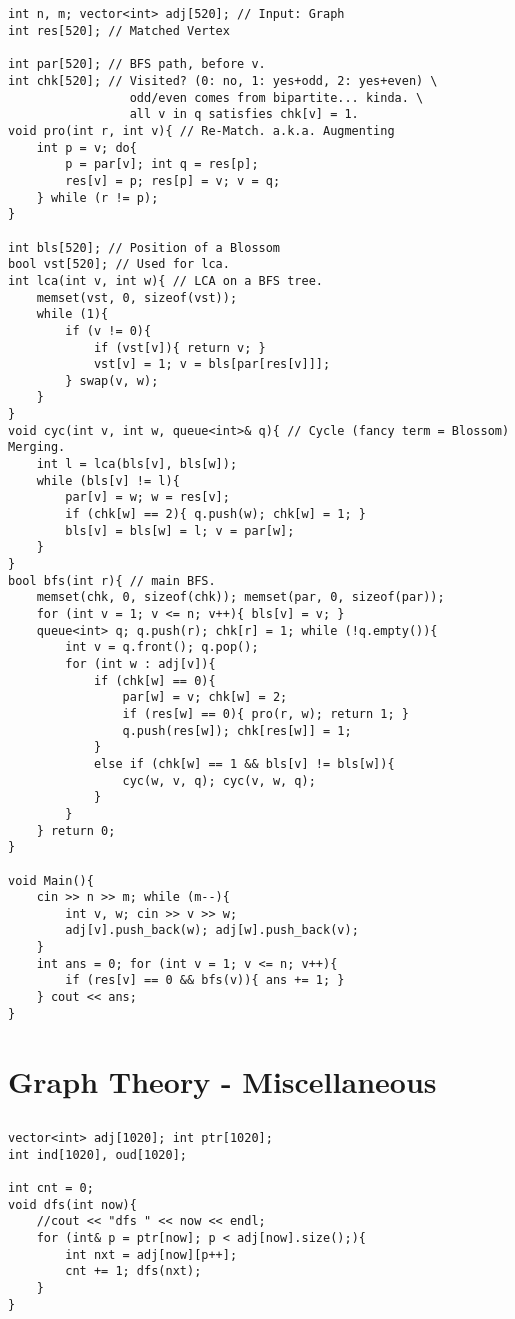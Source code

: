 \documentclass[landscape, 8pt, a4paper, oneside, twocolumn]{extarticle}
\begin{document}
\subsection{}
\begin{verbatim}
int n, m; vector<int> adj[520]; // Input: Graph
int res[520]; // Matched Vertex

int par[520]; // BFS path, before v.
int chk[520]; // Visited? (0: no, 1: yes+odd, 2: yes+even) \
                 odd/even comes from bipartite... kinda. \
                 all v in q satisfies chk[v] = 1.
void pro(int r, int v){ // Re-Match. a.k.a. Augmenting
    int p = v; do{
        p = par[v]; int q = res[p];
        res[v] = p; res[p] = v; v = q;
    } while (r != p);
}

int bls[520]; // Position of a Blossom
bool vst[520]; // Used for lca.
int lca(int v, int w){ // LCA on a BFS tree.
    memset(vst, 0, sizeof(vst));
    while (1){
        if (v != 0){
            if (vst[v]){ return v; }
            vst[v] = 1; v = bls[par[res[v]]];
        } swap(v, w);
    }
}
void cyc(int v, int w, queue<int>& q){ // Cycle (fancy term = Blossom) Merging.
    int l = lca(bls[v], bls[w]);
    while (bls[v] != l){
        par[v] = w; w = res[v];
        if (chk[w] == 2){ q.push(w); chk[w] = 1; }
        bls[v] = bls[w] = l; v = par[w];
    }
}
bool bfs(int r){ // main BFS.
    memset(chk, 0, sizeof(chk)); memset(par, 0, sizeof(par));
    for (int v = 1; v <= n; v++){ bls[v] = v; }
    queue<int> q; q.push(r); chk[r] = 1; while (!q.empty()){
        int v = q.front(); q.pop();
        for (int w : adj[v]){
            if (chk[w] == 0){
                par[w] = v; chk[w] = 2;
                if (res[w] == 0){ pro(r, w); return 1; }
                q.push(res[w]); chk[res[w]] = 1;
            }
            else if (chk[w] == 1 && bls[v] != bls[w]){
                cyc(w, v, q); cyc(v, w, q);
            }
        }
    } return 0;
}

void Main(){
    cin >> n >> m; while (m--){
        int v, w; cin >> v >> w;
        adj[v].push_back(w); adj[w].push_back(v);
    }
    int ans = 0; for (int v = 1; v <= n; v++){
        if (res[v] == 0 && bfs(v)){ ans += 1; }
    } cout << ans;
}
\end{verbatim}
\section{Graph Theory - Miscellaneous}
\subsection{}
\begin{verbatim}
vector<int> adj[1020]; int ptr[1020];
int ind[1020], oud[1020];

int cnt = 0;
void dfs(int now){
	//cout << "dfs " << now << endl;
	for (int& p = ptr[now]; p < adj[now].size();){
		int nxt = adj[now][p++];
		cnt += 1; dfs(nxt);
	}
}
\end{verbatim}
\end{document}
